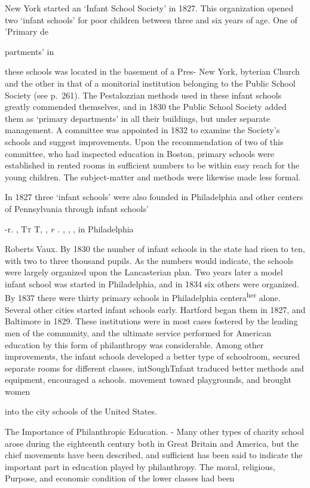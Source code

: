 \documentclass[]{book}
\begin{document}
New York started an `Infant School Society' in 1827. This organization opened two `infant schools' for poor children between three and six years of age. One of 'Primary de

partments' in

these schools was located in the basement of a Pres- New York, byterian Church and the other in that of a monitorial institution belonging to the Public School Society (see p.~261). The Pestalozzian methods used in these infant schools greatly commended themselves, and in 1830 the Public School Society added them as `primary departments' in all their buildings, but under separate management. A committee was appointed in 1832 to examine the Society's schools and suggest improvements. Upon the recommendation of two of this committee, who had inspected education in Boston, primary schools were established in rented rooms in sufficient numbers to be within easy reach for the young children. The subject-matter and methods were likewise made less formal.

In 1827 three `infant schools' were also founded in Philadelphia and other centers of Pennsylvania through infant schools'

-r. , \textsc{Tt }\textsc{T, }, \emph{r . ,} , , in Philadelphia

Roberts Vaux. By 1830 the number of infant schools in the state had risen to ten, with two to three thousand pupils. As the numbers would indicate, the schools were largely organized upon the Lancasterian plan.\protect\hypertarget{ch20.xmlux5cux23para.309.1.0.box.73.228.1267.691.q.60}{}{ Two years later a model infant school was started in Philadelphia, and in 1834 six others were organized. By 1837 there were thirty primary schools in Philadelphia centera\textsuperscript{her} alone. Several other cities started infant schools early. Hartford began them in 1827, and Baltimore in 1829. These institutions were in most cases fostered by the leading men of the community, and the ultimate service performed for American education by this form of philanthropy was considerable. Among other improvements, the infant schools developed a better type of schoolroom, secured separate rooms for different classes, intSoughTnfant traduced better methods and equipment, encouraged a schools. movement toward playgrounds, and brought women}

into the city schools of the United States.

The Importance of Philanthropic Education. - Many other types of charity school arose during the eighteenth century both in Great Britain and America, but the chief movements have been described, and sufficient has been said to indicate the important part in education played by philanthropy. The moral, religious, Purpose, and economic condition of the lower classes had been
\end{document}
